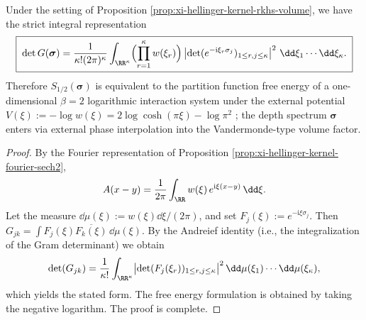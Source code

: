 \begin{proposition}\label{prop:xi-hellinger-kernel-andreief-loggas}
Under the setting of Proposition \ref{prop:xi-hellinger-kernel-rkhs-volume}, we have the strict integral representation
\[
\boxed{\;
\det G(\boldsymbol{\sigma})
=\frac{1}{\kappa!(2\pi)^{\kappa}}
\int_{\RR^\kappa}
\Bigl(\prod_{r=1}^{\kappa} w(\xi_r)\Bigr)\,
\bigl|\det(e^{-\mathrm{i}\xi_r\sigma_j})_{1\le r,j\le\kappa}\bigr|^{2}
\ \dd\xi_1\cdots \dd\xi_\kappa.\;}
\]
Therefore \(S_{1/2}(\boldsymbol{\sigma})\) is equivalent to the partition function free energy of a one-dimensional \(\beta=2\) logarithmic interaction system under the external potential
\(
V(\xi):=-\log w(\xi)=2\log\cosh(\pi\xi)-\log\pi^{2}
\)
; the depth spectrum \(\boldsymbol{\sigma}\) enters via external phase interpolation into the Vandermonde-type volume factor.
\end{proposition}
\begin{proof}
By the Fourier representation of Proposition \ref{prop:xi-hellinger-kernel-fourier-sech2},
\[
A(x-y)=\frac{1}{2\pi}\int_{\RR}w(\xi)\,e^{\mathrm{i}\xi(x-y)}\,\dd\xi.
\]
Let the measure \(\dd\mu(\xi):=w(\xi)\dd\xi/(2\pi)\), and set
\(
F_j(\xi):=e^{-\mathrm{i}\xi\sigma_j}
\).
Then \(G_{jk}=\int F_j(\xi)\overline{F_k(\xi)}\,\dd\mu(\xi)\).
By the Andreief identity (i.e., the integralization of the Gram determinant) we obtain
\[
\det(G_{jk})
=\frac{1}{\kappa!}\int_{\RR^\kappa}\bigl|\det(F_j(\xi_r))_{1\le r,j\le\kappa}\bigr|^{2}\,\dd\mu(\xi_1)\cdots\dd\mu(\xi_\kappa),
\]
which yields the stated form. The free energy formulation is obtained by taking the negative logarithm. The proof is complete.
\end{proof}

